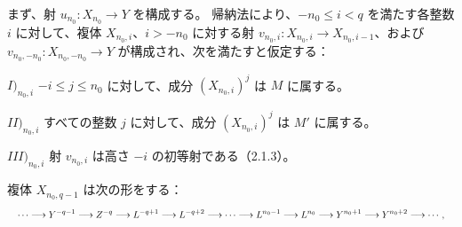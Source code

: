 まず、射 $u_{n_0}\colon X_{n_0}\longrightarrow Y$ を構成する。
帰納法により、$-n_0\leq i<q$ を満たす各整数 $i$ に対して、複体
$X_{n_0,i}$、$i>-n_0$ に対する射
$v_{n_0,i}\colon X_{n_0,i}\longrightarrow X_{n_0,i-1}$、および
$v_{n_0,-n_0}\colon X_{n_0,-n_0}\longrightarrow Y$ が構成され、次を満たすと仮定する：

\noindent $I)_{n_0,i}$ $-i\leq j\leq n_0$ に対して、成分
$(X_{n_0,i})^j$ は $M$ に属する。

\noindent $II)_{n_0,i}$ すべての整数 $j$ に対して、成分
$(X_{n_0,i})^j$ は $M'$ に属する。

\noindent $III)_{n_0,i}$ 射 $v_{n_0,i}$ は高さ $-i$ の初等射である（2.1.3）。

複体 $X_{n_0,q-1}$ は次の形をする：
\[
\resizebox{\textwidth}{!}{$\displaystyle
\cdots\longrightarrow Y^{-q-1}\longrightarrow Z^{-q}
\longrightarrow L^{-q+1}\longrightarrow L^{-q+2}\longrightarrow\cdots
\longrightarrow L^{n_0-1}\longrightarrow L^{n_0}
\longrightarrow Y^{n_0+1}\longrightarrow Y^{n_0+2}\longrightarrow\cdots,
$}
\]
\endgroup
